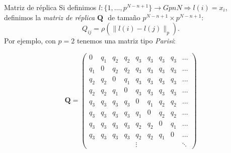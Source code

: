 \documentclass{beamer}
\theoremstyle{definition}
\numberwithin{equation}{section}
\newcommand{\tit}[1]{\textit{#1}}
\newcommand{\pnorm}[1]{\|#1\|_p}
\begin{document}
\begin{frame}{Matriz de réplica}
 Si definimos $l\colon\{1,\dots,p^{N-n+1}\}\to GpnN \Rightarrow l(i)=x_i$,
 definimos la \tit{matriz de réplica} $\textbf{Q   } $ de tamaño $p^{N-n+1}\times p^{N-n+1}$: $$Q_{ij}=\rho(\pnorm{l(i)-l(j)}).$$ Por ejemplo, con $p=2$ tenemos una matriz tipo \tit{Parisi}:
 
 $$
 \boldsymbol{Q}=\left(\begin{array}{lllllllll}
 0 & q_{1} & q_{2} & q_{2} & q_{3} & q_{3} & q_{3} & q_{3} & \dots \\
 q_{1} & 0 & q_{2} & q_{2} & q_{3} & q_{3} & q_{3} & q_{3} & \dots \\
 q_{2} & q_{2} & 0 & q_{1} & q_{3} & q_{3} & q_{3} & q_{3} & \dots \\
 q_{2} & q_{2} & q_{1} & 0 & q_{3} & q_{3} & q_{3} & q_{3} & \dots \\
 q_{3} & q_{3} & q_{3} & q_{3} & 0 & q_{1} & q_{2} & q_{2} & \dots \\
 q_{3} & q_{3} & q_{3} & q_{3} & q_{1} & 0 & q_{2} & q_{2} & \dots \\
 q_{3} & q_{3} & q_{3} & q_{3} & q_{2} & q_{2} & 0 & q_{1} & \dots \\
 q_{3} & q_{3} & q_{3} & q_{3} & q_{2} & q_{2} & q_{1} & 0 & \dots\\
 &  &  &  & \vdots & & &  & \ddots
 \end{array}\right)
 $$
\end{frame}
\end{document}
